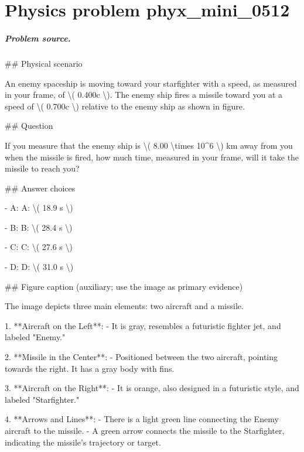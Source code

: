 
\chapter{Physics problem phyx\_mini\_0512}
\label{ch:PhyXMiniProblems_problem_phyx_mini_0512}

\paragraph{Problem source.}
\#\# Physical scenario

An enemy spaceship is moving toward your starfighter with a speed, as measured in your frame, of \textbackslash{}( 0.400c \textbackslash{}). The enemy ship fires a missile toward you at a speed of \textbackslash{}( 0.700c \textbackslash{}) relative to the enemy ship as shown in figure.

\#\# Question

If you measure that the enemy ship is \textbackslash{}( 8.00 \textbackslash{}times 10\textasciicircum{}6 \textbackslash{}) km away from you when the missile is fired, how much time, measured in your frame, will it take the missile to reach you?

\#\# Answer choices

- A: A: \textbackslash{}( 18.9 s \textbackslash{})

- B: B: \textbackslash{}( 28.4 s \textbackslash{})

- C: C: \textbackslash{}( 27.6 s \textbackslash{})

- D: D: \textbackslash{}( 31.0 s \textbackslash{})

\#\# Figure caption (auxiliary; use the image as primary evidence)

The image depicts three main elements: two aircraft and a missile. 

1. **Aircraft on the Left**: 
   - It is gray, resembles a futuristic fighter jet, and labeled "Enemy."
  
2. **Missile in the Center**: 
   - Positioned between the two aircraft, pointing towards the right. It has a gray body with fins.

3. **Aircraft on the Right**: 
   - It is orange, also designed in a futuristic style, and labeled "Starfighter."

4. **Arrows and Lines**:
   - There is a light green line connecting the Enemy aircraft to the missile.
   - A green arrow connects the missile to the Starfighter, indicating the missile's trajectory or target.


